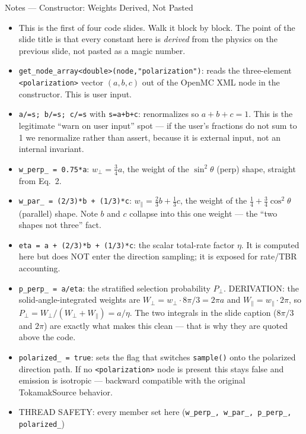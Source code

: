 \documentclass[11pt,aspectratio=169]{beamer}
\begin{document}
\begin{frame}[allowframebreaks]{Notes --- Constructor: Weights Derived, Not Pasted}
{\color{red}\footnotesize
\begin{itemize}
\item This is the first of four code slides. Walk it block by block. The point of the slide title
      is that every constant here is \emph{derived} from the physics on the previous slide, not
      pasted as a magic number.
\item \texttt{get\_node\_array<double>(node,"polarization")}: reads the three-element
      \texttt{<polarization>} vector $(a,b,c)$ out of the OpenMC XML node in the constructor. This
      is user input.
\item \texttt{a/=s; b/=s; c/=s} with \texttt{s=a+b+c}: renormalizes so $a+b+c=1$. This is the
      legitimate ``warn on user input'' spot --- if the user's fractions do not sum to 1 we
      renormalize rather than assert, because it is external input, not an internal invariant.
\item \texttt{w\_perp\_ = 0.75*a}: $w_\perp=\tfrac34 a$, the weight of the $\sin^2\theta$ (perp)
      shape, straight from Eq.\ 2.
\item \texttt{w\_par\_ = (2/3)*b + (1/3)*c}: $w_\parallel=\tfrac23 b+\tfrac13 c$, the weight of the
      $\tfrac14+\tfrac34\cos^2\theta$ (parallel) shape. Note $b$ and $c$ collapse into this one
      weight --- the ``two shapes not three'' fact.
\item \texttt{eta = a + (2/3)*b + (1/3)*c}: the scalar total-rate factor $\eta$. It is computed
      here but does NOT enter the direction sampling; it is exposed for rate/TBR accounting.
\item \texttt{p\_perp\_ = a/eta}: the stratified selection probability $P_\perp$. DERIVATION: the
      solid-angle-integrated weights are $W_\perp = w_\perp\cdot 8\pi/3 = 2\pi a$ and
      $W_\parallel = w_\parallel\cdot 2\pi$, so $P_\perp = W_\perp/(W_\perp+W_\parallel) = a/\eta$.
      The two integrals in the slide caption ($8\pi/3$ and $2\pi$) are exactly what makes this
      clean --- that is why they are quoted above the code.
\item \texttt{polarized\_ = true}: sets the flag that switches \texttt{sample()} onto the polarized
      direction path. If no \texttt{<polarization>} node is present this stays false and emission is
      isotropic --- backward compatible with the original TokamakSource behavior.
\item THREAD SAFETY: every member set here (\texttt{w\_perp\_, w\_par\_, p\_perp\_, polarized\_})

\end{itemize}}
\end{frame}
\end{document}
